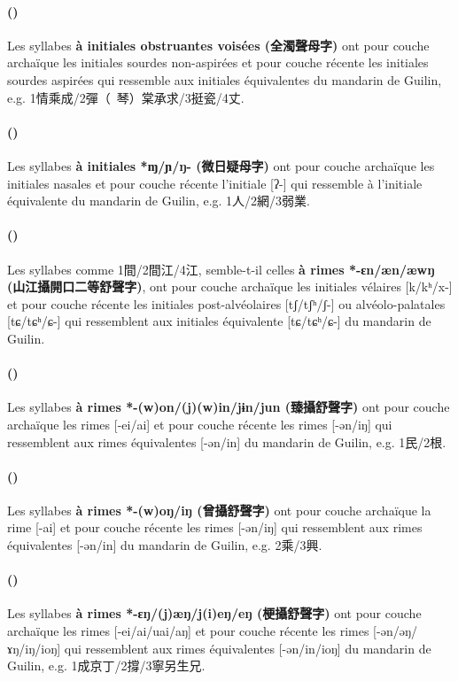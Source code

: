 \documentclass{scrbook}
\newcounter{c}[subsubsection]
\newcommand{\stpc}[1]{\stepcounter{#1}}
\newcommand{\termyyx}[1]{\textbf{#1}}
\begin{document}
\begin{sloppypar}
\stpc{c}\paragraph{()}
Les syllabes \termyyx{à initiales obstruantes voisées (全濁聲母字)} ont pour couche archaïque les initiales sourdes non-aspirées et pour couche récente les initiales sourdes aspirées qui ressemble aux initiales équivalentes du mandarin de Guilin, e.g. 1情乘成/2彈（~琴）棠承求/3挺瓷/4丈.
	
\stpc{c}\paragraph{()}
Les syllabes \termyyx{à initiales *ɱ/ɲ/ŋ- (微日疑母字)} ont pour couche archaïque les initiales nasales et pour couche récente l'initiale [ʔ-] qui ressemble à l'initiale équivalente du mandarin de Guilin, e.g. 1人/2網/3弱業.
	
\stpc{c}\paragraph{()}
Les syllabes comme 1間/2間江/4江, semble-t-il celles \termyyx{à rimes *-ɛn/æn/æwŋ (山江攝開口二等舒聲字)}, ont pour couche archaïque les initiales vélaires [k/kʰ/x-] et pour couche récente les initiales post-alvéolaires [tʃ/tʃʰ/ʃ-] ou alvéolo-palatales [tɕ/tɕʰ/ɕ-] qui ressemblent aux initiales équivalente [tɕ/tɕʰ/ɕ-] du mandarin de Guilin.


\stpc{c}\paragraph{()}
Les syllabes \termyyx{à rimes *-(w)on/(j)(w)in/jɨn/jun (臻攝舒聲字)} ont pour couche archaïque les rimes [-ei/ai] et pour couche récente les rimes [-ən/iŋ] qui ressemblent aux rimes équivalentes [-ən/in] du mandarin de Guilin, e.g. 1民/2根.
	
\stpc{c}\paragraph{()}
Les syllabes \termyyx{à rimes *-(w)oŋ/iŋ (曾攝舒聲字)} ont pour couche archaïque la rime [-ai] et pour couche récente les rimes [-ən/iŋ] qui ressemblent aux rimes équivalentes [-ən/in] du mandarin de Guilin, e.g. 2乘/3興.
	
\stpc{c}\paragraph{()}
Les syllabes \termyyx{à rimes *-ɛŋ/(j)æŋ/j(i)eŋ/eŋ (梗攝舒聲字)} ont pour couche archaïque les rimes [-ei/ai/uai/aŋ] et pour couche récente les rimes [-ən/əŋ/ɤŋ/iŋ/ioŋ] qui ressemblent aux rimes équivalentes [-ən/in/ioŋ] du mandarin de Guilin, e.g. 1成京丁/2撐/3寧另生兄.
	

\end{sloppypar}
\end{document}
